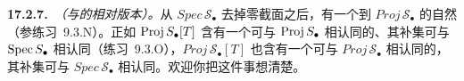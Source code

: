 \textbf{17.2.7.}\ \emph{\trhRemark{}（\trProjective\trCone{}与\trAffine\trCone{}的相对版本）。}\quad 从 $\mathit{Spec}\,\mathscr{S}_\bullet$ 去掉零截面之后，有一个到 $\mathit{Proj}\,\mathscr{S}_\bullet$ 的自然\trMorphism（参\mbox{练习~9.3.N}）。正如 $\operatorname{Proj} S_\bullet[T]$ 含有一个可与 $\operatorname{Proj} S_\bullet$ 相认同的\trClosedSubscheme、其补集可与 $\operatorname{Spec} S_\bullet$ 相认同（\mbox{练习~9.3.O}），$\mathit{Proj}\,\mathscr{S}_\bullet[T]$ 也含有一个可与 $\mathit{Proj}\,\mathscr{S}_\bullet$ 相认同的\trClosedSubscheme，其补集可与 $\mathit{Spec}\,\mathscr{S}_\bullet$ 相认同。欢迎你把这件事想清楚。
